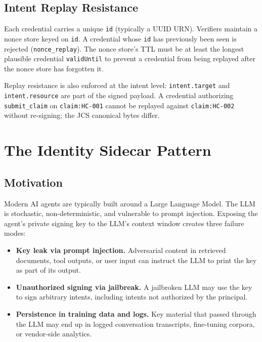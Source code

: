\documentclass[11pt,a4paper,twocolumn]{article}
\begin{document}
\subsection{Intent Replay Resistance}

Each credential carries a unique \verb|id| (typically a UUID URN). Verifiers maintain a nonce store keyed on \verb|id|. A credential whose \verb|id| has previously been seen is rejected (\verb|nonce_replay|). The nonce store's TTL must be at least the longest plausible credential \verb|validUntil| to prevent a credential from being replayed after the nonce store has forgotten it.

Replay resistance is also enforced at the intent level: \verb|intent.target| and \verb|intent.resource| are part of the signed payload. A credential authorizing \verb|submit_claim| on \verb|claim:HC-001| cannot be replayed against \verb|claim:HC-002| without re-signing; the JCS canonical bytes differ.

\section{The Identity Sidecar Pattern}
\label{sec:sidecar}

\subsection{Motivation}

Modern AI agents are typically built around a Large Language Model. The LLM is stochastic, non-deterministic, and vulnerable to prompt injection. Exposing the agent's private signing key to the LLM's context window creates three failure modes:

\begin{itemize}[leftmargin=*]
\item \textbf{Key leak via prompt injection.} Adversarial content in retrieved documents, tool outputs, or user input can instruct the LLM to print the key as part of its output.
\item \textbf{Unauthorized signing via jailbreak.} A jailbroken LLM may use the key to sign arbitrary intents, including intents not authorized by the principal.
\item \textbf{Persistence in training data and logs.} Key material that passed through the LLM may end up in logged conversation transcripts, fine-tuning corpora, or vendor-side analytics.
\end{itemize}
\end{document}
